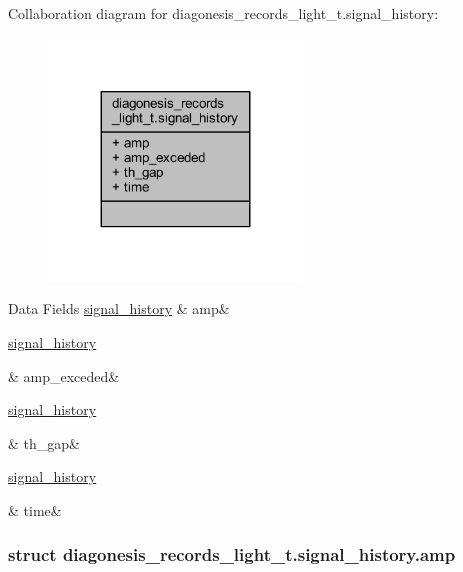 Collaboration diagram for diagonesis\+\_\+records\+\_\+light\+\_\+t.\+signal\+\_\+history\+:\nopagebreak
\begin{figure}[H]
\begin{center}
\leavevmode
\includegraphics[width=191pt]{d1/d0b/a00919}
\end{center}
\end{figure}
\begin{DoxyFields}{Data Fields}
\hypertarget{a00017_a162cacf0d591b432412c89437dea28e0}{\hyperlink{a00017_d8/ddd/a00380}{signal\+\_\+history}}\label{a00017_a162cacf0d591b432412c89437dea28e0}
&
amp&
\\
\hline

\hypertarget{a00017_a354a257167178900099e74081c572fda}{\hyperlink{a00017_de/d08/a00381}{signal\+\_\+history}}\label{a00017_a354a257167178900099e74081c572fda}
&
amp\+\_\+exceded&
\\
\hline

\hypertarget{a00017_ab5598de0231f715ce0c80c93fa0e59c4}{\hyperlink{a00017_d3/d45/a00382}{signal\+\_\+history}}\label{a00017_ab5598de0231f715ce0c80c93fa0e59c4}
&
th\+\_\+gap&
\\
\hline

\hypertarget{a00017_a07cc694b9b3fc636710fa08b6922c42b}{\hyperlink{a00017_da/dee/a00383}{signal\+\_\+history}}\label{a00017_a07cc694b9b3fc636710fa08b6922c42b}
&
time&
\\
\hline

\end{DoxyFields}
\label{d8/ddd/a00380}
\hypertarget{a00017_d8/ddd/a00380}{}
\subsubsection{struct diagonesis\+\_\+records\+\_\+light\+\_\+t.\+signal\+\_\+history.\+amp}


